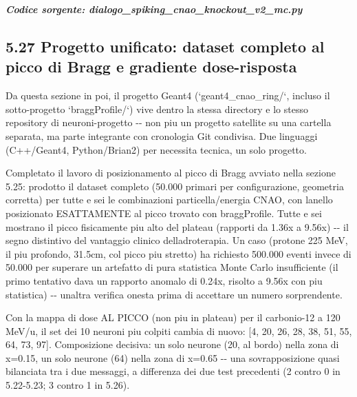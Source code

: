 \documentclass[
  italian,
]{article}
\begin{document}
\textit{\textbf{Codice sorgente: dialogo\_\allowbreak{}spiking\_\allowbreak{}cnao\_\allowbreak{}knockout\_\allowbreak{}v2\_\allowbreak{}mc.py}}


\subsection{5.27 Progetto unificato: dataset completo al picco di Bragg e gradiente dose-risposta}\label{progetto-unificato-dataset-completo-al-picco-di-bragg-e-gradiente-dose-risposta}

Da questa sezione in poi, il progetto Geant4 (`geant4\_\allowbreak{}cnao\_\allowbreak{}ring/`, incluso il sotto-progetto `braggProfile/`) vive dentro la stessa directory e lo stesso repository di neuroni-progetto -\/- non piu\textquotesingle{} un progetto satellite su una cartella separata, ma parte integrante con cronologia Git condivisa. Due linguaggi (C++/Geant4, Python/Brian2) per necessita\textquotesingle{} tecnica, un solo progetto.

Completato il lavoro di posizionamento al picco di Bragg avviato nella sezione 5.25: prodotto il dataset completo (50.000 primari per configurazione, geometria corretta) per tutte e sei le combinazioni particella/energia CNAO, con l\textquotesingle anello posizionato ESATTAMENTE al picco trovato con braggProfile. Tutte e sei mostrano il picco fisicamente piu\textquotesingle{} alto del plateau (rapporti da 1.36x a 9.56x) -\/- il segno distintivo del vantaggio clinico dell\textquotesingle adroterapia. Un caso (protone 225 MeV, il piu\textquotesingle{} profondo, 31.5cm, col picco piu\textquotesingle{} stretto) ha richiesto 500.000 eventi invece di 50.000 per superare un artefatto di pura statistica Monte Carlo insufficiente (il primo tentativo dava un rapporto anomalo di 0.24x, risolto a 9.56x con piu\textquotesingle{} statistica) -\/- un\textquotesingle altra verifica onesta prima di accettare un numero sorprendente.

Con la mappa di dose AL PICCO (non piu\textquotesingle{} in plateau) per il carbonio-12 a 120 MeV/u, il set dei 10 neuroni piu\textquotesingle{} colpiti cambia di nuovo: {[}4, 20, 26, 28, 38, 51, 55, 64, 73, 97{]}. Composizione decisiva: un solo neurone (20, al bordo) nella zona di x=0.15, un solo neurone (64) nella zona di x=0.65 -\/- una sovrapposizione quasi bilanciata tra i due messaggi, a differenza dei due test precedenti (2 contro 0 in 5.22-5.23; 3 contro 1 in 5.26).
\end{document}
